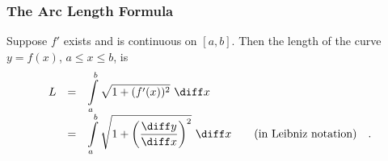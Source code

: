 \begin{frame}
\frametitle{The Arc Length Formula}

\begin{definition}
Suppose $f'$ exists and is continuous on $[a,b]$. Then the length of the curve $y = f(x)$, $a\leq x \leq b$, is
\[
\begin{array}{rclll}
\displaystyle L& =&\displaystyle  \int\limits_a^b \sqrt{1 +( f' (x))^2} \ \diff x\\
 &=&\displaystyle  \int\limits_a^b \sqrt{1 + \left( \frac{\diff y}{\diff x}\right)^2} \ \diff x&&\text{(in Leibniz notation)\quad .}
\end{array}
\]
\end{definition}

\end{frame}
